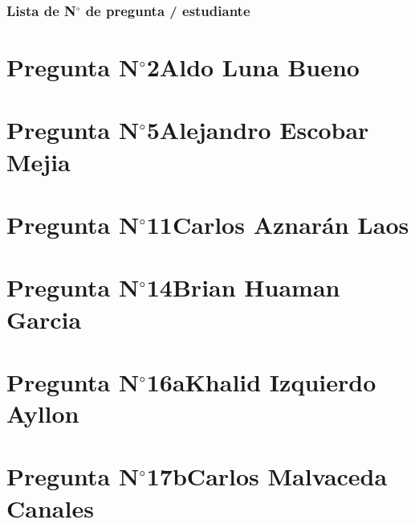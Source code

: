 


\frame{\titlepage}

\begin{frame}
	\frametitle{Lista de N$^{\circ}$ de pregunta / estudiante}
	\tableofcontents
\end{frame}

\section{Pregunta N$^{\circ}$2\qquad Aldo Luna Bueno}
\section{Pregunta N$^{\circ}$5\qquad Alejandro Escobar Mejia}
\section{Pregunta N$^{\circ}$11\qquad Carlos Aznarán Laos}
\section{Pregunta N$^{\circ}$14\qquad Brian Huaman Garcia}
\section{Pregunta N$^{\circ}$16a\qquad Khalid Izquierdo Ayllon}
\section{Pregunta N$^{\circ}$17b\qquad Carlos Malvaceda Canales}
